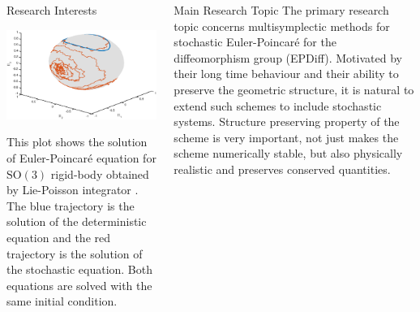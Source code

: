 \documentclass[xcolor={table}]{beamer}
\begin{document}
\begin{frame}[fragile=singleslide,t]
\begin{columns}[onlytextwidth,T]
\begin{column}{.31\textwidth}
\begin{block}{Research Interests}
\end{block}
\begin{sidefigure2}
\includegraphics[width=\hsize]{lphj}
\caption{This plot shows the solution of Euler-Poincar\'{e} equation for $\mathrm{SO}(3)$ rigid-body obtained by Lie-Poisson integrator \cite{G2017}. The blue trajectory is the solution of the deterministic equation and the red trajectory is the solution of the stochastic equation. Both equations are solved with the same initial condition. }
\end{sidefigure2}

\end{column}


\begin{column}{.31\textwidth}
\begin{block}{Main Research Topic}
The primary research topic concerns multisymplectic methods for stochastic Euler-Poincar\'{e} for the diffeomorphism group (EPDiff). Motivated by their long time behaviour and their ability to preserve the geometric structure, it is natural to extend such schemes to include stochastic systems. Structure preserving property of the scheme is very important, not just makes the scheme numerically stable, but also physically realistic and preserves conserved quantities.\\
\end{block}



\end{column}
\end{columns}
\end{frame}
\end{document}

